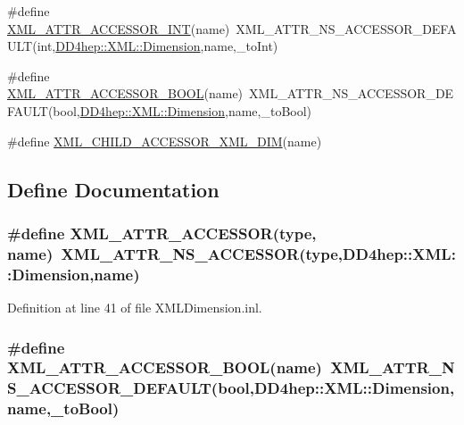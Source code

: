 \begin{DoxyCompactItemize}
\item 
\#define \hyperlink{_x_m_l_dimension_8inl_aa9f53a44681848d2aeda1c5cdac2efb8}{XML\_\-ATTR\_\-ACCESSOR\_\-INT}(name)~XML\_\-ATTR\_\-NS\_\-ACCESSOR\_\-DEFAULT(int,\hyperlink{struct_d_d4hep_1_1_x_m_l_1_1_dimension}{DD4hep::XML::Dimension},name,\_\-toInt)
\item 
\#define \hyperlink{_x_m_l_dimension_8inl_a8efa1be16815f59e7b049cab22c08a21}{XML\_\-ATTR\_\-ACCESSOR\_\-BOOL}(name)~XML\_\-ATTR\_\-NS\_\-ACCESSOR\_\-DEFAULT(bool,\hyperlink{struct_d_d4hep_1_1_x_m_l_1_1_dimension}{DD4hep::XML::Dimension},name,\_\-toBool)
\item 
\#define \hyperlink{_x_m_l_dimension_8inl_af3b6c67a307b3febcce9072bfcfd4d5e}{XML\_\-CHILD\_\-ACCESSOR\_\-XML\_\-DIM}(name)
\end{DoxyCompactItemize}


\subsection{Define Documentation}
\hypertarget{_x_m_l_dimension_8inl_accabcb0a0a37bcff066b1281c9814553}{
\subsubsection[{XML\_\-ATTR\_\-ACCESSOR}]{\setlength{\rightskip}{0pt plus 5cm}\#define XML\_\-ATTR\_\-ACCESSOR(type, \/  name)~XML\_\-ATTR\_\-NS\_\-ACCESSOR(type,{\bf DD4hep::XML::Dimension},name)}}
\label{_x_m_l_dimension_8inl_accabcb0a0a37bcff066b1281c9814553}


Definition at line 41 of file XMLDimension.inl.\hypertarget{_x_m_l_dimension_8inl_a8efa1be16815f59e7b049cab22c08a21}{
\subsubsection[{XML\_\-ATTR\_\-ACCESSOR\_\-BOOL}]{\setlength{\rightskip}{0pt plus 5cm}\#define XML\_\-ATTR\_\-ACCESSOR\_\-BOOL(name)~XML\_\-ATTR\_\-NS\_\-ACCESSOR\_\-DEFAULT(bool,{\bf DD4hep::XML::Dimension},name,\_\-toBool)}}
\label{_x_m_l_dimension_8inl_a8efa1be16815f59e7b049cab22c08a21}


